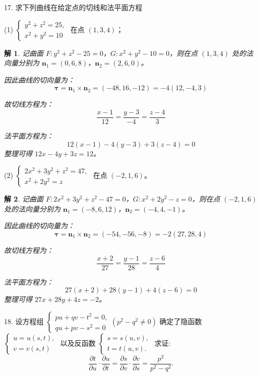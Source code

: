 \documentclass[a4paper,12pt]{article}
\newtheorem*{sol}{解}
\begin{document}
17. 求下列曲线在给定点的切线和法平面方程

(1) $\begin{cases} y^2+z^2=25, \\ x^2+y^2=10 \end{cases}$ 在点 $(1,3,4)$；

\begin{sol}
    记曲面 $F:y^2+z^2-25=0$，$G:x^2+y^2-10=0$，则在点 $(1,3,4)$ 处的法向量分别为 $\boldsymbol{n}_1=(0,6,8)$，$\boldsymbol{n}_2=(2,6,0)$。

    因此曲线的切向量为：
    $$\boldsymbol{\tau}=\boldsymbol{n}_1\times \boldsymbol{n}_2=(-48,16,-12)=-4(12,-4,3)$$

    故切线方程为：
    $$\frac{x-1}{12}=\frac{y-3}{-4}=\frac{z-4}{3}$$

    法平面方程为：
    $$12(x-1)-4(y-3)+3(z-4)=0$$
    整理可得 $12x-4y+3z=12$。
\end{sol}

(2) $\begin{cases} 2x^2+3y^2+z^2=47, \\ x^2+2y^2=z \end{cases}$ 在点 $(-2,1,6)$。

\begin{sol}
    记曲面 $F:2x^2+3y^2+z^2-47=0$，$G:x^2+2y^2-z=0$，则在点 $(-2,1,6)$ 处的法向量分别为 $\boldsymbol{n}_1=(-8,6,12)$，$\boldsymbol{n}_2=(-4,4,-1)$。

    因此曲线的切向量为：
    $$\boldsymbol{\tau}=\boldsymbol{n}_1\times \boldsymbol{n}_2=(-54,-56,-8)=-2(27,28,4)$$

    故切线方程为：
    $$\frac{x+2}{27}=\frac{y-1}{28}=\frac{z-6}{4}$$

    法平面方程为：
    $$27(x+2)+28(y-1)+4(z-6)=0$$
    整理可得 $27x+28y+4z=-2$。
\end{sol}

18. 设方程组 $\begin{cases}
        pu+qv-t^2=0, \\
        qu+pv-s^2=0
    \end{cases} (p^2-q^2\neq 0)$ 确定了隐函数 $\begin{cases}
        u=u(s,t), \\
        v=v(s,t)
    \end{cases}$ 以及反函数 $\begin{cases}
        s=s(u,v), \\
        t=t(u,v).
    \end{cases}$ 求证:
$$
    \frac{\partial t}{\partial u}\cdot\frac{\partial u}{\partial t} = \frac{\partial s}{\partial v}\cdot\frac{\partial v}{\partial s} = \frac{p^2}{p^2-q^2}.
$$
\end{document}
